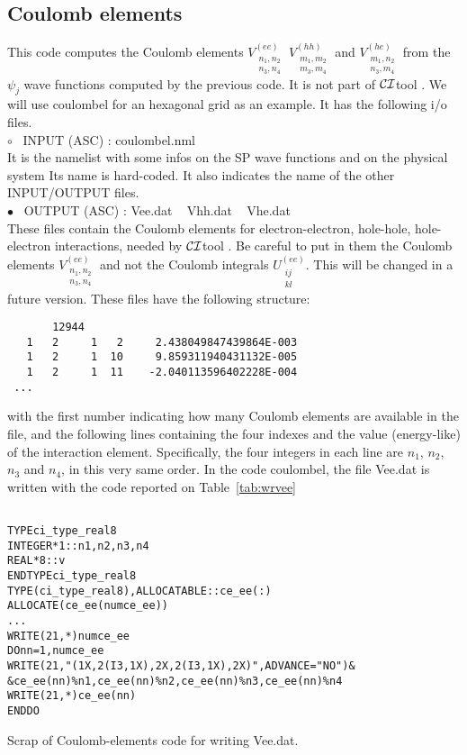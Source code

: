 \documentclass[12pt,twoside]{article}
\newcommand*{\CItool}[0]{{$\cal CI$}\textsf{tool} }
\begin{document}
\subsection*{Coulomb elements}
This code computes the Coulomb elements
$V_{\substack{n_1,n_2\\n_3,n_4}}^{(ee)}$
$V_{\substack{m_1,m_2\\m_3,m_4}}^{(hh)}$ and
$V_{\substack{m_1,n_2\\n_3,m_4}}^{(he)}$ from the $\psi_j$ wave
functions computed by the previous code.  It is not part of
\CItool. We will use \textsf{coulombel} for an hexagonal
grid as an example. It has the following i/o files.
\\
$\circ$ \ \textsf{INPUT (ASC) : coulombel.nml} \\ It is the namelist
with some infos on the SP wave functions and on the physical system
Its name is hard-coded.  It also indicates the name of
the other \textsf{INPUT/OUTPUT} files.
\\
$\bullet$ \ \textsf{OUTPUT (ASC) : Vee.dat ~ Vhh.dat ~ Vhe.dat} \\
These files contain the Coulomb elements for electron-electron,
hole-hole, hole-electron interactions, needed by \CItool.  Be careful
to put in them the Coulomb elements
$V_{\substack{n_1,n_2\\n_3,n_4}}^{(ee)}$ and not the Coulomb integrals
$U_{\substack{ij\\kl}}^{(ee)}$. This will be changed in a future version.
These files have the following structure:
\begin{verbatim}
       12944
   1   2     1   2     2.438049847439864E-003
   1   2     1  10     9.859311940431132E-005
   1   2     1  11    -2.040113596402228E-004
 ...
\end{verbatim}
\vspace{2 mm}
with the first number indicating how many Coulomb elements are
available in the file, and the following lines containing the four
indexes and the value (energy-like) of the interaction element.
Specifically, the four integers in each line are $n_1$, $n_2$, $n_3$
and $n_4$, in this very same order.  In the code \textsf{coulombel},
the file \textsf{Vee.dat} is written with the code reported on
Table~\ref{tab:wrvee}

\begin{table}
\begin{alltt}
\ \\
TYPE ci_type_real8
  INTEGER*1  ::  n1, n2, n3, n4
  REAL*8 ::  v
END TYPE ci_type_real8
TYPE( ci_type_real8 ), ALLOCATABLE :: ce_ee(:)
ALLOCATE(ce_ee(numce_ee))
 ...
WRITE(21,*) numce_ee
DO nn= 1, numce_ee
  WRITE(21,"(1X,2(I3,1X),2X,2(I3,1X),2X)",ADVANCE="NO")   &
       &  ce_ee(nn)\%n1, ce_ee(nn)\%n2, ce_ee(nn)\%n3, ce_ee(nn)\%n4
  WRITE(21,*)  ce_ee(nn)%v
END DO
\end{alltt}
\caption{Scrap of Coulomb-elements code for writing \textsf{Vee.dat}.}
\label{tab:wrvee}
\end{table}
\end{document}
